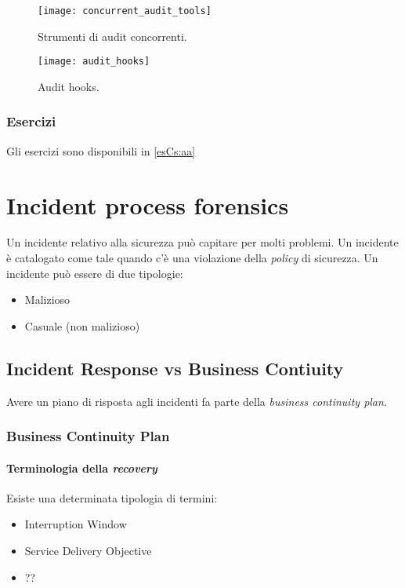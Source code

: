 \begin{figure}[h!]
        \begin{center}
                \texttt{[image: concurrent\_audit\_tools]}
        \end{center}
        \caption{Strumenti di audit concorrenti.}
        \label{fig:concurrent:audit:tools}
\end{figure}


\begin{figure}[h!]
        \begin{center}
                \texttt{[image: audit\_hooks]}
        \end{center}
        \caption{Audit hooks.}
        \label{fig:audit:hooks}
\end{figure}

\section{Esercizi}

Gli esercizi sono disponibili in \ref{esCs:aa}

\part{Incident process forensics}

Un incidente relativo alla sicurezza può capitare per molti problemi. Un
incidente è catalogato come tale quando c'è una violazione della \textit{policy}
di sicurezza. Un incidente può essere di due tipologie:
\begin{itemize}
\item Malizioso
\item Casuale (non malizioso)
\end{itemize}

\chapter{Incident Response vs Business Contiuity}
\label{IRBC}

Avere un piano di risposta agli incidenti fa parte della \textit{business
continuity plan}.

\section{Business Continuity Plan}

\subsection{Terminologia della \textit{recovery}}
Esiste una determinata tipologia di termini:
\begin{itemize}
\item Interruption Window
\item Service Delivery Objective
\item ?? 
\end{itemize}

